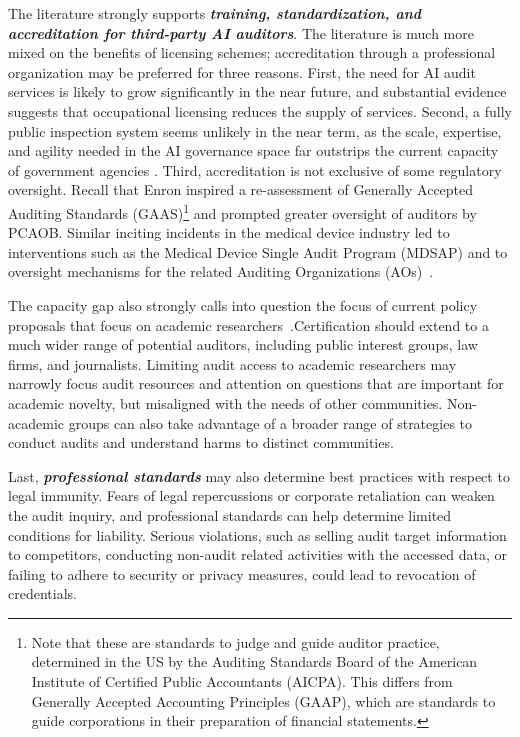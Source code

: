 \documentclass[sigconf]{acmart}
\begin{document}
The literature strongly supports \textbf{\textit{training, standardization, and accreditation for third-party AI auditors}}. The literature is much more mixed on the benefits of licensing schemes; accreditation through a professional organization may be preferred for three reasons. First, the need for AI audit services is likely to grow significantly in the near future, and substantial evidence suggests that occupational licensing reduces the supply of services. Second, a fully public inspection system seems unlikely in the near term, as the scale, expertise, and agility needed in the AI governance space far outstrips the current capacity of government agencies \cite{engstrom2020algorithmic}. Third, accreditation is not exclusive of some regulatory oversight. Recall that Enron inspired a re-assessment of Generally Accepted Auditing Standards (GAAS)\footnote{Note that these are standards to judge and guide auditor practice, determined in the US by the Auditing Standards Board of the American Institute of Certified Public Accountants (AICPA). This differs from Generally Accepted Accounting Principles (GAAP), which are standards to guide corporations in their preparation of financial statements.} and prompted greater oversight of auditors by PCAOB. Similar inciting incidents in the medical device industry led to interventions such as the Medical Device Single Audit Program (MDSAP) and to oversight mechanisms for the related Auditing Organizations (AOs)~\cite{chen2018comparative}. 

The capacity gap also strongly calls into question the focus of current policy proposals that focus on academic researchers~\cite{fbpersily2018}.Certification should extend to a much wider range of potential auditors, including public interest groups, law firms, and journalists. Limiting audit access to academic researchers may narrowly focus audit resources and attention on questions that are important for academic novelty, but misaligned with the needs of other communities. Non-academic groups can also take advantage of a broader range of strategies to conduct audits and understand harms to distinct communities. 

Last, \textbf{\textit{professional standards}} may also determine best practices with respect to legal immunity. Fears of legal repercussions or corporate retaliation can weaken the audit inquiry, and professional standards can help determine limited conditions for liability. Serious violations, such as selling audit target information to competitors, conducting non-audit related activities with the accessed data, or failing to adhere to security or privacy measures, could lead to revocation of credentials. 
\end{document}
